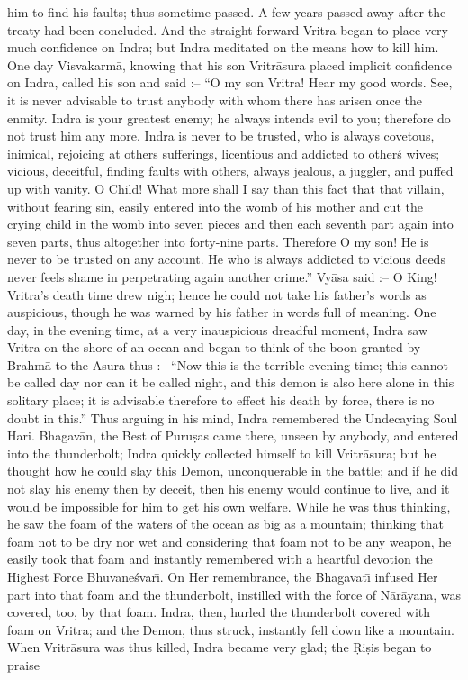 him to find his faults; thus sometime passed. A few years passed away after the treaty had been concluded. And the straight-forward Vritra began to place very much confidence on Indra; but Indra meditated on the means how to kill him. One day Visvakarm\=a, knowing that his son Vritr\=asura placed implicit confidence on Indra, called his son and said :-- ``O my son Vritra! Hear my good words. See, it is never advisable to trust anybody with whom there has arisen once the enmity. Indra is your greatest enemy; he always intends evil to you; therefore do not trust him any more. Indra is never to be trusted, who is always covetous, inimical, rejoicing at others sufferings, licentious and addicted to other\'s wives; vicious, deceitful, finding faults with others, always jealous, a juggler, and puffed up with vanity. O Child! What more shall I say than this fact that that villain, without fearing sin, easily entered into the womb of his mother and cut the crying child in the womb into seven pieces and then each seventh part again into seven parts, thus altogether into forty-nine parts. Therefore O my son! He is never to be trusted on any account. He who is always addicted to vicious deeds never feels shame in perpetrating again another crime.'' Vy\=asa said :-- O King! Vritra's death time drew nigh; hence he could not take his father's words as auspicious, though he was warned by his father in words full of meaning. One day, in the evening time, at a very inauspicious dreadful moment, Indra saw Vritra on the shore of an ocean and began to think of the boon granted by Brahm\=a to the Asura thus :-- ``Now this is the terrible evening time; this cannot be called day nor can it be called night, and this demon is also here alone in this solitary place; it is advisable therefore to effect his death by force, there is no doubt in this.'' Thus arguing in his mind, Indra remembered the Undecaying Soul Hari. Bhagav\=an, the Best of Puru\d{s}as came there, unseen by anybody, and entered into the thunderbolt; Indra quickly collected himself to kill Vritr\=asura; but he thought how he could slay this Demon, unconquerable in the battle; and if he did not slay his enemy then by deceit, then his enemy would continue to live, and it would be impossible for him to get his own welfare. While he was thus thinking, he saw the foam of the waters of the ocean as big as a mountain; thinking that foam not to be dry nor wet and considering that foam not to be any weapon, he easily took that foam and instantly remembered with a heartful devotion the Highest Force Bhuvane\'svar\={\i}. On Her remembrance, the Bhagavat\={\i} infused Her part into that foam and the thunderbolt, instilled with the force of N\=ar\=ayana, was covered, too, by that foam. Indra, then, hurled the thunderbolt covered with foam on Vritra; and the Demon, thus struck, instantly fell down like a mountain. When Vritr\=asura was thus killed, Indra became very glad; the \d{R}i\d{s}is began to praise

